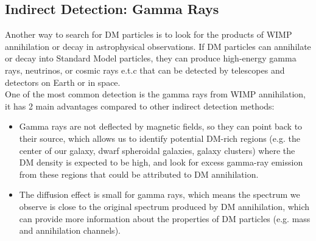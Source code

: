 \subsection{Indirect Detection: Gamma Rays}
\begin{intuition}
    Another way to search for DM particles is to look for the products of WIMP annihilation or decay in astrophysical observations. If DM particles can annihilate or decay into Standard Model particles, they can produce high-energy gamma rays, neutrinos, or cosmic rays e.t.c that can be detected by telescopes and detectors on Earth or in space. \\

    One of the most common detection is the gamma rays from WIMP annihilation, it has 2 main advantages compared to other indirect detection methods:
    \begin{itemize}
        \item Gamma rays are not deflected by magnetic fields, so they can point back to their source, which allows us to identify potential DM-rich regions (e.g. the center of our galaxy, dwarf spheroidal galaxies, galaxy clusters) where the DM density is expected to be high, and look for excess gamma-ray emission from these regions that could be attributed to DM annihilation.
        \item The diffusion effect is small for gamma rays, which means the spectrum we observe is close to the original spectrum produced by DM annihilation, which can provide more information about the properties of DM particles (e.g. mass and annihilation channels).
    \end{itemize}
\end{intuition}

